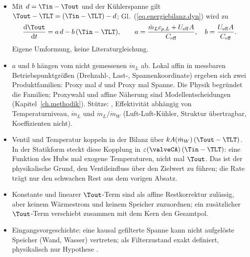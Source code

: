 
\begin{itemize}
  \item Mit $d = \Tin - \Tout$ und der Kühlerspanne gilt
    $\Tout - \TLT = (\Tin - \TLT) - d$; Gl.~(\ref{eq.energiebilanz.dyn}) wird zu
    \[
      \frac{\mathrm{d}\Tout}{\mathrm{d}t} = a\,d - b\,(\Tin - \TLT),
      \qquad
      a = \frac{\dot m_L c_{p,L} + U_{\mathrm{eff}}A}{C_{\mathrm{eff}}},
      \quad
      b = \frac{U_{\mathrm{eff}}A}{C_{\mathrm{eff}}}.
    \]
    Eigene Umformung, keine Literaturgleichung.
  \item $a$ und $b$ hängen vom nicht gemessenen $\dot m_L$ ab. Lokal affin in
    messbaren Betriebspunktgrößen (Drehzahl-, Last-, Spannenkoordinate) ergeben
    sich zwei Produktfamilien: Proxy mal $d$ und Proxy mal Spanne. Die Physik
    begründet die Familien; Proxywahl und affine Näherung sind
    Modellentscheidungen (Kapitel~\ref{ch.methodik}). Stütze:
    \cite[S.~132]{erikssonMODELINGTURBOCHARGEDSI}, Effektivität abhängig von
    Temperaturniveau, $\dot m_L$ und $\dot m_L/\dot m_W$ (Luft-Luft-Kühler,
    Struktur übertragbar, Koeffizienten nicht).
  \item Ventil und Temperatur koppeln in der Bilanz über
    $kA(\dot m_W)\,(\Tout - \TLT)$. In der Statikform steckt diese Kopplung in
    $\varepsilon(\valveCA)\,(\Tin - \TLT)$: eine Funktion des Hubs mal exogene
    Temperaturen, nicht mal $\Tout$. Das ist der physikalische Grund, den
    Ventileinfluss über den Zielwert zu führen; die Rate trägt nur den schwachen
    Rest aus dem vorigen Absatz.
  \item Konstante und linearer $\Tout$-Term sind als affine Restkorrektur
    zulässig, aber keinem Wärmestrom und keinem Speicher zuzuordnen; ein
    zusätzlicher $\Tout$-Term verschiebt zusammen mit dem Kern den Gesamtpol.
  \item Eingangsvorgeschichte: eine kausal gefilterte Spanne kann nicht
    aufgelöste Speicher (Wand, Wasser) vertreten; als Filterzustand exakt
    definiert, physikalisch nur Hypothese
    \cite[Abschn.~5, S.~10--12]{vagapovDynamicModelTemperature2022}.
\end{itemize}

